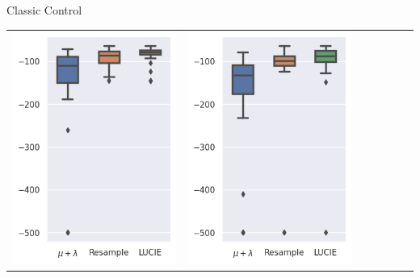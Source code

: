 \begin{frame}{\tcv{} Classic Control}
\begin{table}[]
\begin{tabular}{ccccccc}
            \includegraphics[width=\figwidth]{images/LUCIE/acrobot/boxplot_acrobot_400_u.png} &
            \includegraphics[width=\figwidth]{images/LUCIE/acrobot/boxplot_acrobot_600_u.png} &

\end{tabular}
\end{table}
\end{frame}
